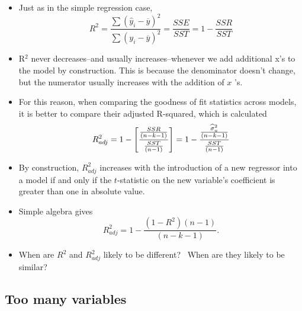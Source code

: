 \documentclass[11pt]{article}
\begin{document}
\begin{itemize}
\item Just as in the simple regression case,%
\begin{equation*}
R^{2}=\frac{\sum \left( \widehat{y}_{i}-\overline{y}\right) ^{2}}{\sum
\left( y_{i}-\overline{y}\right) ^{2}}=\frac{SSE}{SST}=1-\frac{SSR}{SST}
\end{equation*}

\item R$^{2}$ never decreases--and usually increases--whenever we add
additional x's to the model by construction. This is because the denominator
doesn't change, but the numerator usually increases with the addition of $x$%
's.

\item For this reason, when comparing the goodness of fit statistics across
models, it is better to compare their adjusted R-squared, which is calculated%
\begin{equation*}
R_{adj}^{2}=1-\left[ \frac{\frac{SSR}{\left( n-k-1\right) }}{\frac{SST}{%
\left( n-1\right) }}\right] =1-\frac{\frac{\widehat{\sigma }_{u}^{2}}{\left(
n-k-1\right) }}{\frac{SST}{\left( n-1\right) }}
\end{equation*}

\item By construction, $R_{adj}^{2}$ increases with the introduction of a
new regressor into a model if and only if the $t$-statistic on the new
variable's coefficient is greater than one in absolute value.

\item Simple algebra gives%
\begin{equation*}
R_{adj}^{2}=1-\frac{\left( 1-R^{2}\right) \left( n-1\right) }{\left(
n-k-1\right) }.
\end{equation*}

\item When are $R^{2}$ and $R_{adj}^{2}$ likely to be different? \ When are
they likely to be similar?
\end{itemize}

\subsection{Too many variables}
\end{document}
